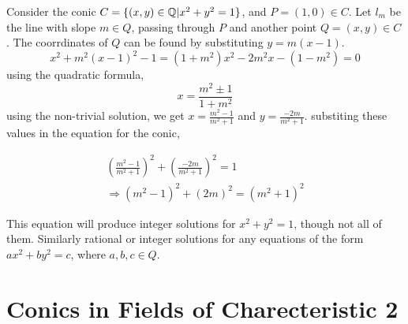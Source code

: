 Consider the conic $C=\{(x,y)\in\mathbb{Q}\vert x^2+y^2=1\}$, and $P=(1,0)\in C$. Let $l_m$ be the line
with slope $m\in Q$, passing through $P$ and another point $Q=(x,y)\in C$. The coorrdinates
of $Q$ can be found by substituting $y=m(x-1)$.
$$x^2+m^2(x-1)^2-1=(1+m^2)x^2-2m^2x-(1-m^2)=0$$
using the quadratic formula,
$$x=\frac{m^2\pm1}{1+m^2}$$
using the non-trivial solution, we get $x=\frac{m^2-1}{m^2+1}$ and $y=\frac{-2m}{m^2+1}$.
substiting these values in the equation for the conic,

\begin{eqnarray*}
  (\frac{m^2-1}{m^2+1})^2+(\frac{-2m}{m^2+1})^2=1\\
  \Longrightarrow (m^2-1)^2+(2m)^2=(m^2+1)^2
\end{eqnarray*}

This equation will produce integer solutions for $x^2+y^2=1$, though not all of them. Similarly
rational or integer solutions for any equations of the form $ax^2+by^2=c$, where $a,b,c\in Q$.

\section{Conics in Fields of Charecteristic 2}
